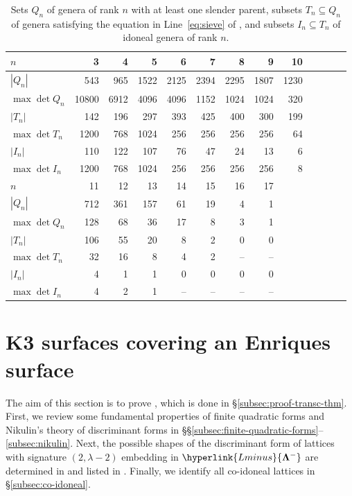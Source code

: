 \documentclass[a4paper]{amsart}
\theoremstyle{definition}
\theoremstyle{plain}
\newcommand{\bLambda}{\mathbf{\Lambda}}
\newcommand{\Lminus}{\hyperlink{Lminus}{\bLambda^-}}
\begin{document}
\begin{table}
\footnotesize
\caption{Sets \(Q_n\) of genera of rank \(n\) with at least one slender parent, subsets \(T_n \subseteq Q_n\) of genera satisfying the equation in Line~\ref{eq:sieve} of  , and subsets \(I_n \subseteq T_n\) of idoneal genera of rank \(n\). }
\label{tab:summary.idoneal}
\begin{tabular}{lrrrrrrrrrrrr}
    \toprule
    \(n\)             & 3    & 4    & 5    & 6    & 7    & 8    & 9    & 10  \\
    \midrule 
    \(|Q_n|\)         & 543   & 965  & 1522 & 2125 & 2394 & 2295 & 1807 & 1230 \\
    \(\max \det Q_n\) & 10800   & 6912 & 4096 & 4096 & 1152 & 1024 & 1024 & 320  \\
    \(|T_n|\)         & 142   & 196  & 297  & 393  & 425  & 400  & 300  & 199  \\
    \(\max \det T_n\) & 1200   & 768  & 1024 & 256  & 256  & 256  & 256  & 64   \\
    \(|I_n|\)         & 110& 122  & 107 & 76    & 47 & 24 & 13 & 6  \\
    \(\max \det I_n\) & 1200& 768 & 1024 & 256   & 256& 256& 256& 8   \\
    \midrule 
    \(n\)             & 11  & 12  & 13  & 14 & 15 & 16 & 17 \\
    \midrule 
    \(|Q_n|\)         & 712 & 361 & 157 & 61 & 19 & 4  & 1  \\
    \(\max \det Q_n\) & 128 & 68  & 36  & 17 & 8  & 3  & 1  \\
    \(|T_n|\)         & 106 & 55  & 20  & 8  & 2  & 0  & 0  \\
    \(\max \det T_n\) & 32  & 16  & 8   & 4  & 2  & -- & -- \\
    \(|I_n|\)         & 4 & 1 & 1 & 0  & 0  & 0  & 0  \\
    \(\max \det I_n\) & 4  & 2 & 1  & -- & -- & -- & -- \\
    \bottomrule
\end{tabular}
\end{table}

\section{K3 surfaces covering an Enriques surface} \label{sec:K3-covering-Enriques}

The aim of this section is to prove , which is done in §\ref{subsec:proof-transc-thm}. 
First, we review some fundamental properties of finite quadratic forms and Nikulin's theory of discriminant forms in §§\ref{subsec:finite-quadratic-forms}--\ref{subsec:nikulin}. 
Next, the possible shapes of the discriminant form of lattices with signature \((2, \lambda - 2)\) embedding in \(\Lminus\) are determined in  and listed in . 
Finally, we identify all co-idoneal lattices in §\ref{subsec:co-idoneal}.
\end{document}
